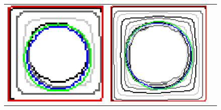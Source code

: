 \begin{figure}[hp!]
\begin{tabular}{ccc}
	\includegraphics[scale=0.17]{figures/chapter5/flow/square/radius_5/ii/elastica/len_pen_0.01000/jonctions_1/curve_segs_4/best/gs_0.50000/summary.pdf} &	
	
	\includegraphics[scale=0.17]{figures/chapter5/flow/square/radius_5/ii/elastica/len_pen_0.01000/jonctions_1/curve_segs_4/best/gs_0.25000/summary.pdf}\\[2em]
	

\end{tabular}
\end{figure}

